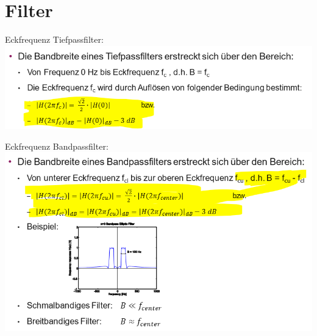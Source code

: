 \section{Filter}

Eckfrequenz Tiefpassfilter:\\
\includegraphics[width=\columnwidth]{Images/screenshot003}

Eckfrequenz Bandpassfilter:\\
\includegraphics[width=\columnwidth]{Images/screenshot004}